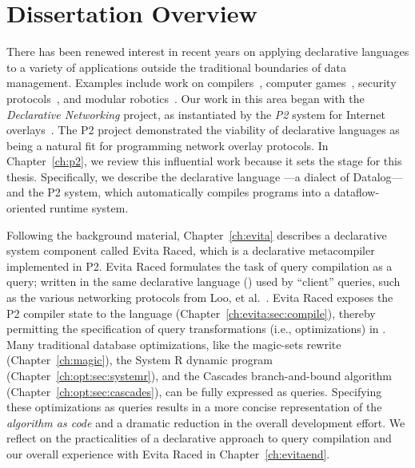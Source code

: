 \chapter[Dissertation Overview]{Dissertation Overview}
\label{ch:overview}

There has been renewed interest in recent years on applying declarative
languages to a variety of applications outside the traditional boundaries of
data management.  Examples include work on compilers~\cite{lam05context},
computer games~\cite{white-sigmod07}, security protocols~\cite{li-padl03}, and
modular robotics~\cite{ashley-iros07}.  Our work in this area began with the
{\em Declarative Networking} project, as instantiated by the {\em P2} system
for Internet overlays~\cite{p2:sosp, loo-sigmod06}.  The P2 project
demonstrated the viability of declarative languages as being a natural fit for
programming network overlay protocols.  In Chapter~\ref{ch:p2}, we review this
influential work because it sets the stage for this thesis.  Specifically, we
describe the declarative language \OVERLOG---a dialect of Datalog---and the
P2 system, which automatically compiles \OVERLOG programs into a
dataflow-oriented runtime system.

Following the background material, Chapter~\ref{ch:evita} describes a
declarative system component called Evita Raced, which is a declarative
metacompiler implemented in P2.  Evita Raced formulates the task of query
compilation as a query; written in the same declarative language (\OVERLOG)
used by ``client'' queries, such as the various networking protocols from Loo,
et al.~\cite{loo-sigmod06, p2:sosp}.  Evita Raced exposes the P2 compiler state
to the \OVERLOG language (Chapter~\ref{ch:evita:sec:compile}), thereby
permitting the specification of query transformations (i.e., optimizations) in
\OVERLOG.  Many traditional database optimizations, like the magic-sets rewrite
(Chapter~\ref{ch:magic}), the System R dynamic program
(Chapter~\ref{ch:opt:sec:systemr}), and the Cascades branch-and-bound algorithm
(Chapter~\ref{ch:opt:sec:cascades}), can be fully expressed as \OVERLOG
queries.  Specifying these optimizations as \OVERLOG queries results in a more
concise representation of the {\em algorithm as code} and a dramatic reduction
in the overall development effort.  We reflect on the practicalities of a
declarative approach to query compilation and our overall experience with Evita
Raced in Chapter~\ref{ch:evitaend}.
 
